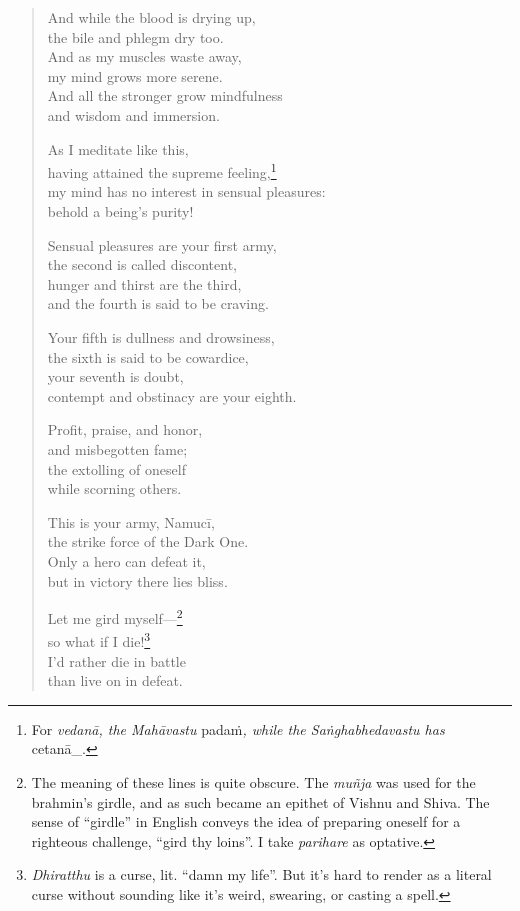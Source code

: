 \documentclass[12pt,openany]{book}%
\begin{document}
\begin{verse}
And while the blood is drying up, \\
the bile and phlegm dry too. \\
And as my muscles waste away, \\
my mind grows more serene. \\
And all the stronger grow mindfulness \\
and wisdom and immersion. 

As I meditate like this, \\
having attained the supreme feeling,\footnote{For \textit{\textsanskrit{vedanā}, the \textsanskrit{Mahāvastu} }\textsanskrit{padaṁ}\textit{, while the \textsanskrit{Saṅghabhedavastu} has }\textsanskrit{cetanā\_}. } \\
my mind has no interest in sensual pleasures: \\
behold a being’s purity! 

Sensual pleasures are your first army, \\
the second is called discontent, \\
hunger and thirst are the third, \\
and the fourth is said to be craving. 

Your fifth is dullness and drowsiness, \\
the sixth is said to be cowardice, \\
your seventh is doubt, \\
contempt and obstinacy are your eighth. 

Profit, praise, and honor, \\
and misbegotten fame; \\
the extolling of oneself \\
while scorning others. 

This is your army, \textsanskrit{Namucī}, \\
the strike force of the Dark One. \\
Only a hero can defeat it, \\
but in victory there lies bliss. 

Let me gird myself—\footnote{The meaning of these lines is quite obscure. The \textit{\textsanskrit{muñja}} was used for the brahmin’s girdle, and as such became an epithet of Vishnu and Shiva. The sense of “girdle” in English conveys the idea of preparing oneself for a righteous challenge, “gird thy loins”. I take \textit{parihare} as optative. } \\
so what if I die!\footnote{\textit{Dhiratthu} is a curse, lit. “damn my life”. But it's hard to render as a literal curse without sounding like it’s weird, swearing, or casting a spell. } \\
I’d rather die in battle \\
than live on in defeat. 


\end{verse}
\end{document}
